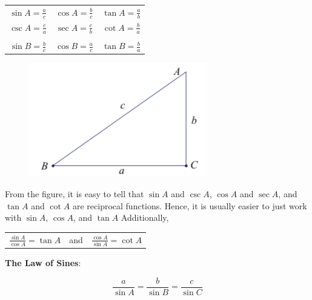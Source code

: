         \begin{center}
            \begin{tabular}{ccc}
                $\sin A = \frac{a}{c}$
                & $\cos A = \frac{b}{c}$
                & $\tan A = \frac{a}{b}$ \\
                $\csc A = \frac{c}{a}$
                & $\sec A = \frac{c}{b}$
                & $\cot A = \frac{b}{a}$\\\\
                $\sin B = \frac{b}{c}$
                & $\cos B = \frac{a}{c}$
                & $\tan B = \frac{b}{a}$
            \end{tabular}
        \end{center}

        \begin{figure} [h]
            \centering
            \includegraphics [scale=0.4] {Resources/Unit2Triangles/Trig.fig1.png}
        \end{figure}

        \noindent From the figure, it is easy to tell that $\sin A$ and $\csc A$, $\cos A$ and
        $\sec A$, and $\tan A$ and $\cot A$ are reciprocal functions. Hence, it is usually easier
        to just work with $\sin A$, $\cos A$, and $\tan A$ Additionally,

        \begin{center}
            \begin{tabular}{ccc}
                $\frac{\sin A}{\cos A}=\tan A$
                & and &
                $\frac{\cos A}{\sin A}=\cot A$
            \end{tabular}
        \end{center}

        \noindent \color{purple} \textbf{The Law of Sines}:  \color{black}

        \begin{equation*}
            \frac{a}{\sin{A}} = \frac{b}{\sin{B}} = \frac{c}{\sin{C}}
        \end{equation*} \\

